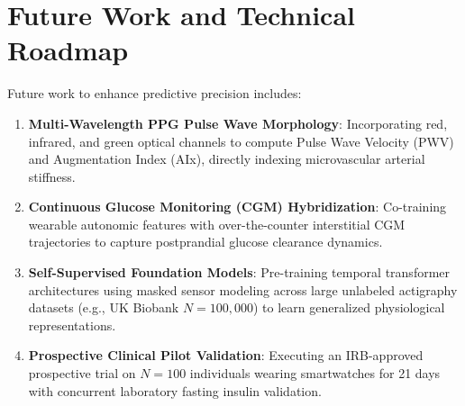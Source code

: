 \documentclass[12pt,a4paper,oneside]{report}
\begin{document}
\section{Future Work and Technical Roadmap}
Future work to enhance predictive precision includes:
\begin{enumerate}
    \item \textbf{Multi-Wavelength PPG Pulse Wave Morphology}: Incorporating red, infrared, and green optical channels to compute Pulse Wave Velocity (PWV) and Augmentation Index (AIx), directly indexing microvascular arterial stiffness.
    \item \textbf{Continuous Glucose Monitoring (CGM) Hybridization}: Co-training wearable autonomic features with over-the-counter interstitial CGM trajectories to capture postprandial glucose clearance dynamics.
    \item \textbf{Self-Supervised Foundation Models}: Pre-training temporal transformer architectures using masked sensor modeling across large unlabeled actigraphy datasets (e.g., UK Biobank $N = 100,000$) to learn generalized physiological representations.
    \item \textbf{Prospective Clinical Pilot Validation}: Executing an IRB-approved prospective trial on $N = 100$ individuals wearing smartwatches for 21 days with concurrent laboratory fasting insulin validation.
\end{enumerate}
\end{document}
